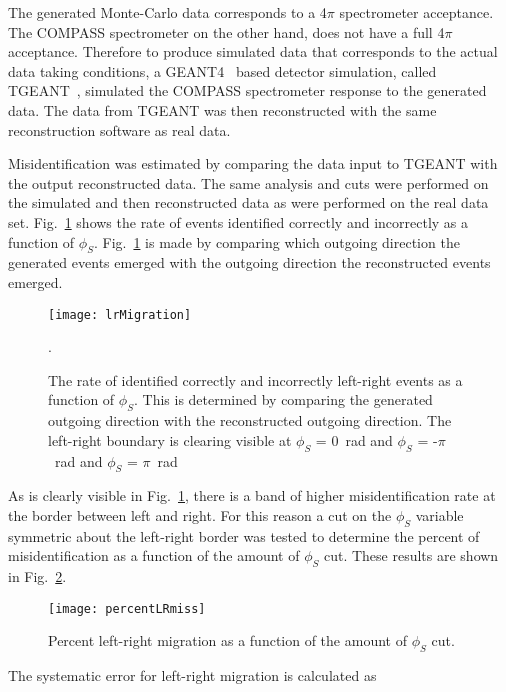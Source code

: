 The generated Monte-Carlo data corresponds to a 4$\pi$ spectrometer acceptance.
The COMPASS spectrometer on the other hand, does not have a full 4$\pi$
acceptance.  Therefore to produce simulated data that corresponds to the actual
data taking conditions, a GEANT4~\cite{AGOSTINELLI2003250} based detector
simulation, called TGEANT~\cite{TGEANTthesis}, simulated the COMPASS
spectrometer response to the generated data.  The data from TGEANT was then
reconstructed with the same reconstruction software as real data.

Misidentification was estimated by comparing the data input to TGEANT with the
output reconstructed data.  The same analysis and cuts were performed on the
simulated and then reconstructed data as were performed on the real data set.
Fig.~\ref{fig::lrMigration} shows the rate of events identified correctly and
incorrectly as a function of $\phi_S$.  Fig.~\ref{fig::lrMigration} is made by
comparing which outgoing direction the generated events emerged with the
outgoing direction the reconstructed events emerged.

\begin{figure}[h!t]
  \centering
  \texttt{[image: lrMigration]}
  \caption{The rate of identified correctly and incorrectly left-right events as
    a function of $\phi_{S}$.  This is determined by comparing the generated
    outgoing direction with the reconstructed outgoing direction.  The
    left-right boundary is clearing visible at $\phi_{S}$ = 0~rad and $\phi_{S}$
    = -$\pi$~rad and $\phi_{S}$ = $\pi$~rad}.
  \label{fig::lrMigration}
\end{figure}

\noindent
As is clearly visible in Fig.~\ref{fig::lrMigration}, there is a band of higher
misidentification rate at the border between left and right.  For this reason a
cut on the $\phi_{S}$ variable symmetric about the left-right border was tested
to determine the percent of misidentification as a function of the amount of
$\phi_{S}$ cut.  These results are shown in Fig.~\ref{fig::percentLRmiss}.

\begin{figure}[h!t]
  \centering \texttt{[image: percentLRmiss]}
  \caption{Percent left-right migration as a function of the amount of
    $\phi_{S}$ cut.}
    \label{fig::percentLRmiss}
\end{figure}

The systematic error for left-right migration is calculated as

